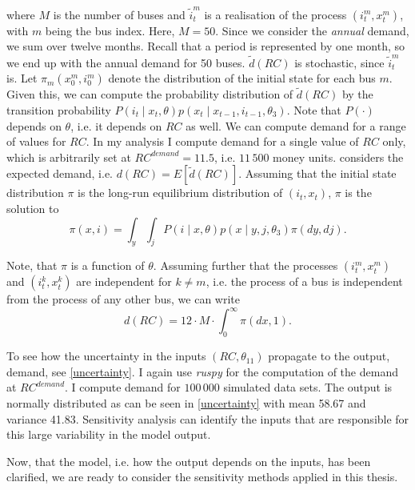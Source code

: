 \noindent where $M$ is the number of buses and ${\tilde{i}}_t^m$ is a realisation of the process $(i_t^m, x_t^m)$, with $m$ being the bus index. Here, $M=50$. Since we consider the \textit{annual} demand, we sum over twelve months. Recall that a period is represented by one month, so we end up with the annual demand for 50 buses. $\tilde{d}(RC)$ is stochastic, since ${\tilde{i}}_t^m$ is. Let $\pi_m(x_0^m, i_0^m)$ denote the distribution of the initial state for each bus $m$. Given this, we can compute the probability distribution of $\tilde{d}(RC) $ by the transition probability $P(i_t \mid x_t, \theta)p(x_t \mid x_{t-1}, i_{t-1}, \theta_3) $. Note that $P(\cdot)$ depends on $\theta$, i.e. it depends on $RC$ as well. We can compute demand for a range of values for $RC$. In my analysis I compute demand for a single value of $RC$ only, which is arbitrarily set at $RC^{demand}=11.5$, i.e. $11\,500$ money units. \citet{R87} considers the expected demand, i.e. $d(RC)=E[\tilde{d}(RC)]$. Assuming that the initial state distribution $\pi$ is the long-run equilibrium distribution of $(i_t, x_t)$, $\pi$ is the solution to
\begin{equation*}
\pi(x, i)=\int_y \int_j P(i \mid x, \theta) p(x \mid y, j, \theta_3) \pi(dy, dj).
\end{equation*}

Note, that $\pi$ is a function of $\theta$. Assuming further that the processes $ (i_t^m, x_t^m)$ and $(i_t^k, x_t^k)$ are independent for $k \neq m$, i.e. the process of a bus is independent from the process of any other bus, we can write
\begin{equation*}
d(RC)=12 \cdot M \cdot \int_0^{\infty} \pi(dx, 1).
\end{equation*}

To see how the uncertainty in the inputs $(RC, \theta_{11})$ propagate to the output, demand, see \cref{uncertainty}. I again use \textit{ruspy} for the computation of the demand at $RC^{demand}$. I compute demand for $100\,000$ simulated data sets. The output is normally distributed as can be seen in \cref{uncertainty} with mean 58.67 and variance 41.83. Sensitivity analysis can identify the inputs that are responsible for this large variability in the model output.

Now, that the model, i.e. how the output depends on the inputs, has been clarified, we are ready to consider the sensitivity methods applied in this thesis.

